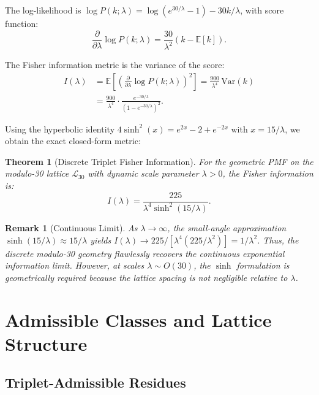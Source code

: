 \documentclass[11pt]{article}
\newtheorem{theorem}{Theorem}
\newtheorem{remark}{Remark}
\begin{document}
The log-likelihood is $\log P(k; \lambda) = \log(e^{30/\lambda} - 1) - 30k/\lambda$, with score function:
\begin{equation}
    \frac{\partial}{\partial \lambda} \log P(k; \lambda) = \frac{30}{\lambda^2}\left(k - \mathbb{E}[k]\right).
\end{equation}

The Fisher information metric is the variance of the score:
\begin{align}
    I(\lambda) &= \mathbb{E}\left[\left(\frac{\partial}{\partial \lambda} \log P(k; \lambda)\right)^2\right] = \frac{900}{\lambda^4}\,\text{Var}(k) \nonumber\\
    &= \frac{900}{\lambda^4} \cdot \frac{e^{-30/\lambda}}{(1 - e^{-30/\lambda})^2}.
\end{align}

Using the hyperbolic identity $4\sinh^2(x) = e^{2x} - 2 + e^{-2x}$ with $x = 15/\lambda$, we obtain the exact closed-form metric:

\begin{theorem}[Discrete Triplet Fisher Information]
For the geometric PMF on the modulo-30 lattice $\mathcal{L}_{30}$ with dynamic scale parameter $\lambda > 0$, the Fisher information is:
\begin{equation}
    I(\lambda) = \frac{225}{\lambda^4 \sinh^2(15/\lambda)}.
\end{equation}
\end{theorem}

\begin{remark}[Continuous Limit]
As $\lambda \to \infty$, the small-angle approximation $\sinh(15/\lambda) \approx 15/\lambda$ yields $I(\lambda) \to 225/[\lambda^4 (225/\lambda^2)] = 1/\lambda^2$. Thus, the discrete modulo-30 geometry flawlessly recovers the continuous exponential information limit. However, at scales $\lambda \sim O(30)$, the $\sinh$ formulation is geometrically required because the lattice spacing is not negligible relative to $\lambda$.
\end{remark}

\section{Admissible Classes and Lattice Structure}

\subsection{Triplet-Admissible Residues}
\end{document}
